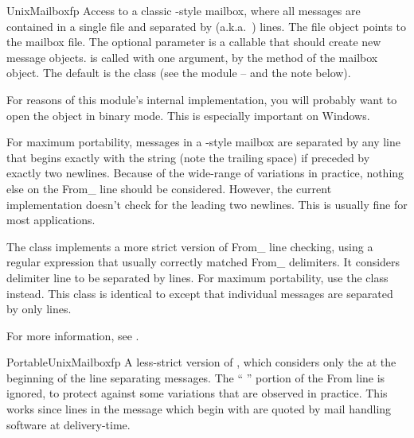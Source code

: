 \begin{classdesc}{UnixMailbox}{fp}
Access to a classic \UNIX-style mailbox, where all messages are
contained in a single file and separated by 
(a.k.a.\ ) lines.  The file object  points to the
mailbox file.  The optional  parameter is a callable that
should create new message objects.   is called with one
argument,  by the  method of the mailbox
object.  The default is the  class (see the
 module -- and the note below).

\begin{notice}
  For reasons of this module's internal implementation, you will
  probably want to open the  object in binary mode.  This is
  especially important on Windows.
\end{notice}

For maximum portability, messages in a \UNIX-style mailbox are
separated by any line that begins exactly with the string  (note the trailing space) if preceded by exactly two newlines.
Because of the wide-range of variations in practice, nothing else on
the From_ line should be considered.  However, the current
implementation doesn't check for the leading two newlines.  This is
usually fine for most applications.

The  class implements a more strict version of
From_ line checking, using a regular expression that usually correctly
matched From_ delimiters.  It considers delimiter line to be separated
by  lines.  For maximum portability,
use the  class instead.  This class is
identical to  except that individual messages are
separated by only  lines.

For more information, see
.
\end{classdesc}

\begin{classdesc}{PortableUnixMailbox}{fp}
A less-strict version of , which considers only the
 at the beginning of the line separating messages.  The
`` '' portion of the From line is ignored, to
protect against some variations that are observed in practice.  This
works since lines in the message which begin with  are
quoted by mail handling software at delivery-time.
\end{classdesc}

